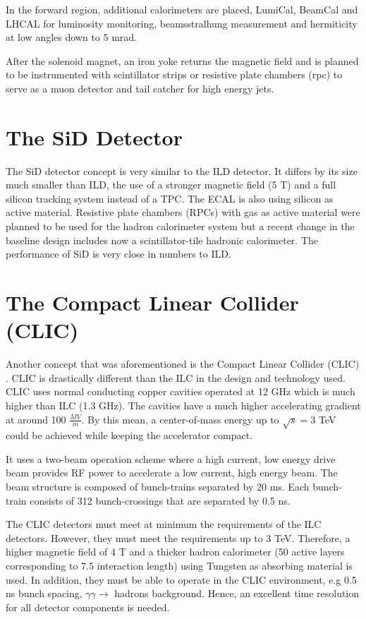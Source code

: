 In the forward region, additional calorimeters are placed, LumiCal, BeamCal and LHCAL for luminosity monitoring, beamsstralhung measurement and hermiticity at low angles down to 5 mrad.

After the solenoid magnet, an iron yoke returns the magnetic field and is planned to be instrumented with scintillator strips or resistive plate chambers (\acrshort{rpc}) to serve as a muon detector and tail catcher for high energy jets.

\section{The SiD Detector}

The SiD detector concept is very similar to the ILD detector. It differs by its size much smaller than ILD, the use of a stronger magnetic field (5 T) and a full silicon tracking system instead of a TPC. The ECAL is also using silicon as active material. Resistive plate chambers (RPCs) with gas as active material were planned to be used for the hadron calorimeter system but a recent change in the baseline design includes now a scintillator-tile hadronic calorimeter. The performance of SiD is very close in numbers to ILD.

\section{The Compact Linear Collider (CLIC)}

Another concept that was aforementioned is the Compact Linear Collider (CLIC) \cite{CLIC_CDR}. CLIC is drastically different than the ILC in the design and technology used. CLIC uses normal conducting copper cavities operated at 12 GHz which is much higher than ILC (1.3 GHz). The cavities have a much higher accelerating gradient at around 100 $\frac{MV}{m}$. By this mean, a center-of-mass energy up to $\sqrt{s} = 3$ TeV could be achieved while keeping the accelerator compact.

It uses a two-beam operation scheme where a high current, low energy drive beam provides RF power to accelerate a low current, high energy beam. The beam structure is composed of bunch-trains separated by 20 ms. Each bunch-train consists of 312 bunch-crossings that are separated by 0.5 ns.

The CLIC detectors must meet at minimum the requirements of the ILC detectors. However, they must meet the requirements up to 3 TeV. Therefore, a higher magnetic field of 4 T and a thicker hadron calorimeter (50 active layers corresponding to 7.5 interaction length) using Tungsten as absorbing material is used. In addition, they must be able to operate in the CLIC environment, e.g 0.5 ns bunch spacing, $\gamma\gamma \rightarrow$ hadrons background. Hence, an excellent time resolution for all detector components is needed.

